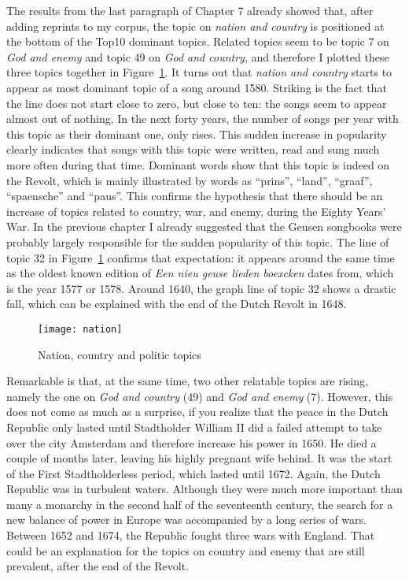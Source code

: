 The results from the last paragraph of Chapter 7 already showed that, after adding reprints to my corpus, the topic on \textit{nation and country} is positioned at the bottom of the Top10 dominant topics. Related topics seem to be topic 7 on \textit{God and enemy} and topic 49 on \textit{God and country}, and therefore I plotted these three topics together in Figure~\ref{fig:nation}. It turns out that \textit{nation and country} starts to appear as most dominant topic of a song around 1580. Striking is the fact that the line does not start close to zero, but close to ten: the songs seem to appear almost out of nothing. In the next forty years, the number of songs per year with this topic as their dominant one, only rises. This sudden increase in popularity clearly indicates that songs with this topic were written, read and sung much more often during that time. Dominant words show that this topic is indeed on the Revolt, which is mainly illustrated by words as \enquote{prins}, \enquote{land}, \enquote{graaf}, \enquote{spaensche} and \enquote{paus}. This confirms the hypothesis that there should be an increase of topics related to country, war, and enemy, during the Eighty Years' War. In the previous chapter I already suggested that the Geusen songbooks were probably largely responsible for the sudden popularity of this topic. The line of topic 32 in Figure~\ref{fig:nation} confirms that expectation: it appears around the same time as the oldest known edition of \textit{Een nieu geuse lieden boexcken} dates from, which is the year 1577 or 1578.\autocite[75]{porteman_een_2009} Around 1640, the graph line of topic 32 shows a drastic fall, which can be explained with the end of the Dutch Revolt in 1648.

\begin{figure}[hbt!]
	\centering
	\texttt{[image: nation]}
	\caption{Nation, country and politic topics}
	\label{fig:nation}
\end{figure}

Remarkable is that, at the same time, two other relatable topics are rising, namely the one on \textit{God and country} (49) and \textit{God and enemy} (7). However, this does not come as much as a surprise, if you realize that the peace in the Dutch Republic only lasted until Stadtholder William II did a failed attempt to take over the city Amsterdam and therefore increase his power in 1650.\autocite[55]{prak_gouden_2012} He died a couple of months later, leaving his highly pregnant wife behind. It was the start of the First Stadtholderless period, which lasted until 1672. Again, the Dutch Republic was in turbulent waters. Although they were much more important than many a monarchy in the second half of the seventeenth century, the search for a new balance of power in Europe was accompanied by a long series of wars. Between 1652 and 1674, the Republic fought three wars with England.\autocite[57]{prak_gouden_2012} That could be an explanation for the topics on country and enemy that are still prevalent, after the end of the Revolt.

